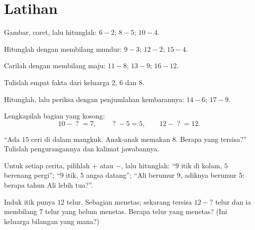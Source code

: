\section{Latihan}

\begin{exercise}[$\star$]\label{exo:g1:subtraction:1}
Gambar, coret, lalu hitunglah: $6 - 2$; \quad $8 - 5$; \quad
$10 - 4$.
\end{exercise}

\begin{exercise}[$\star$]\label{exo:g1:subtraction:2}
Hitunglah dengan membilang mundur: $9 - 3$; \quad $12 - 2$; \quad
$15 - 4$.
\end{exercise}

\begin{exercise}[$\star$]\label{exo:g1:subtraction:3}
Carilah  dengan membilang maju: $11 - 8$; \quad $13 - 9$;
\quad $16 - 12$.
\end{exercise}

\begin{exercise}[$\star$]\label{exo:g1:subtraction:4}
Tulislah empat fakta dari keluarga $2$, $6$ dan $8$.
\end{exercise}

\begin{exercise}[$\star$]\label{exo:g1:subtraction:5}
Hitunglah, lalu periksa dengan penjumlahan kembarannya: $14 - 6$;
\quad $17 - 9$.
\end{exercise}

\begin{exercise}[$\star$]\label{exo:g1:subtraction:6}
Lengkapilah bagian yang kosong:
\[
10 - \;?\; = 7, \qquad
\;?\; - 5 = 5, \qquad
12 - \;?\; = 12 .
\]
\end{exercise}

\begin{exercise}[$\star$]\label{exo:g1:subtraction:7}
``Ada $15$ ceri di dalam mangkuk. Anak-anak memakan $8$. Berapa yang
tersisa?'' Tulislah pengurangannya dan kalimat jawabannya.
\end{exercise}

\begin{exercise}[$\star$]\label{exo:g1:subtraction:8}
Untuk setiap cerita, pilihlah $+$ atau $-$, lalu hitunglah: ``$9$
itik di kolam, $5$ berenang pergi''; ``$9$ itik, $5$ angsa datang'';
``Ali berumur $9$, adiknya berumur $5$: berapa tahun Ali lebih tua?''.
\end{exercise}

\begin{exercise}[$\star\star$]\label{exo:g1:subtraction:9}
Induk itik punya $12$ telur. Sebagian menetas; sekarang tersisa
$12 - ?$ telur dan ia membilang $7$ telur yang belum menetas. Berapa
telur yang menetas? (Ini keluarga bilangan yang mana?)

\end{exercise}
